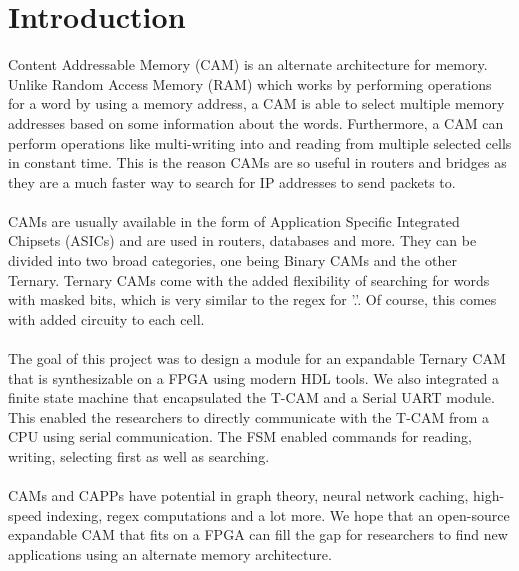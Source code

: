\section{Introduction}
Content Addressable Memory (CAM) is an alternate architecture for memory. Unlike Random Access Memory (RAM) which works by 
performing operations for a word by using a memory address, a CAM is able to select multiple memory addresses based on some information about the words. 
Furthermore, a CAM can perform operations like multi-writing into and reading from multiple selected cells in constant time.
This is the reason CAMs are so useful in routers and bridges as they are a much faster way to search for IP addresses to send packets to.
\\\\  
CAMs are usually available in the form of Application Specific Integrated Chipsets (ASICs) and are used in routers, databases and more.
They can be divided into two broad categories, one being Binary CAMs and the other Ternary. 
Ternary CAMs come with the added flexibility of searching for words with masked bits, which is very similar to the regex for '.'. 
Of course, this comes with added circuity to each cell. 
\\\\ 
The goal of this project was to design a module for an expandable Ternary CAM that is synthesizable on a FPGA using modern HDL tools. 
We also integrated a finite state machine that encapsulated the T-CAM and a Serial UART module. 
This enabled the researchers to directly communicate with the T-CAM from a CPU using serial communication.
The FSM enabled commands for reading, writing, selecting first as well as searching. 
\\\\
CAMs and CAPPs have potential in graph theory, neural network caching, high-speed indexing, regex computations and a lot more. 
We hope that an open-source expandable CAM that fits on a FPGA can fill the gap for researchers to find new applications using an alternate memory architecture. 